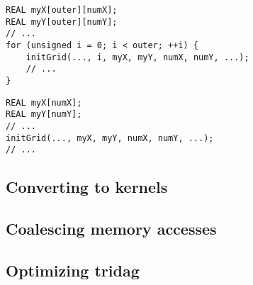 \documentclass[a4paper]{article}
\begin{document}
\begin{lstlisting}[caption={bla bla},label={lst:duplicate1}]
REAL myX[outer][numX];
REAL myY[outer][numY];
// ...
for (unsigned i = 0; i < outer; ++i) {
    initGrid(..., i, myX, myY, numX, numY, ...);
    // ...
}
\end{lstlisting}
\begin{lstlisting}[caption={bla bla},label={lst:duplicate2}]
REAL myX[numX];
REAL myY[numY];
// ...
initGrid(..., myX, myY, numX, numY, ...);
// ...
\end{lstlisting}

\subsection{Converting to kernels}


\subsection{Coalescing memory accesses}


\subsection{Optimizing tridag}

\end{document}

